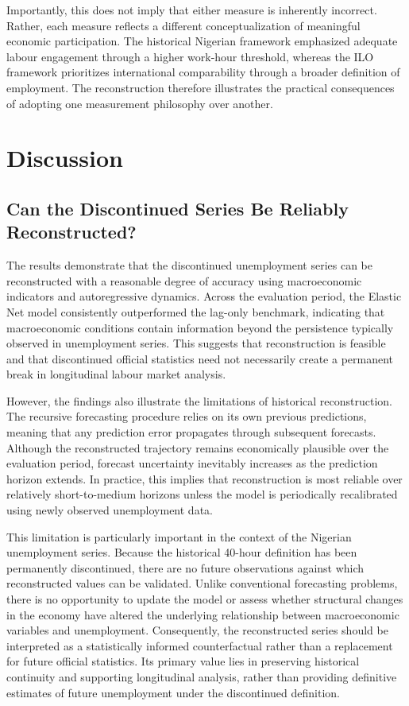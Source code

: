 \documentclass[
  letterpaper,
  DIV=11,
  numbers=noendperiod]{scrartcl}
\begin{document}
Importantly, this does not imply that either measure is inherently
incorrect. Rather, each measure reflects a different conceptualization
of meaningful economic participation. The historical Nigerian framework
emphasized adequate labour engagement through a higher work-hour
threshold, whereas the ILO framework prioritizes international
comparability through a broader definition of employment. The
reconstruction therefore illustrates the practical consequences of
adopting one measurement philosophy over another.

\section{Discussion}\label{discussion}

\subsection{Can the Discontinued Series Be Reliably
Reconstructed?}\label{can-the-discontinued-series-be-reliably-reconstructed}

The results demonstrate that the discontinued unemployment series can be
reconstructed with a reasonable degree of accuracy using macroeconomic
indicators and autoregressive dynamics. Across the evaluation period,
the Elastic Net model consistently outperformed the lag-only benchmark,
indicating that macroeconomic conditions contain information beyond the
persistence typically observed in unemployment series. This suggests
that reconstruction is feasible and that discontinued official
statistics need not necessarily create a permanent break in longitudinal
labour market analysis.

However, the findings also illustrate the limitations of historical
reconstruction. The recursive forecasting procedure relies on its own
previous predictions, meaning that any prediction error propagates
through subsequent forecasts. Although the reconstructed trajectory
remains economically plausible over the evaluation period, forecast
uncertainty inevitably increases as the prediction horizon extends. In
practice, this implies that reconstruction is most reliable over
relatively short-to-medium horizons unless the model is periodically
recalibrated using newly observed unemployment data.

This limitation is particularly important in the context of the Nigerian
unemployment series. Because the historical 40-hour definition has been
permanently discontinued, there are no future observations against which
reconstructed values can be validated. Unlike conventional forecasting
problems, there is no opportunity to update the model or assess whether
structural changes in the economy have altered the underlying
relationship between macroeconomic variables and unemployment.
Consequently, the reconstructed series should be interpreted as a
statistically informed counterfactual rather than a replacement for
future official statistics. Its primary value lies in preserving
historical continuity and supporting longitudinal analysis, rather than
providing definitive estimates of future unemployment under the
discontinued definition.
\end{document}
